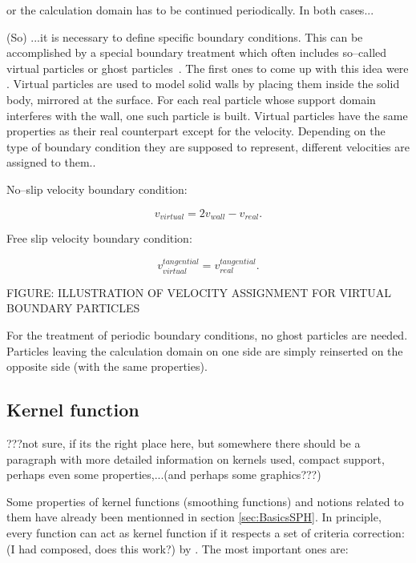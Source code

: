\documentclass{report}
\begin{document}
 or the calculation domain has to be continued periodically. In both cases...

(So) ...it is necessary to define specific boundary
conditions. This can be accomplished by a special boundary treatment which
often includes so--called virtual particles or ghost
particles~\cite{Liu2003}. The first ones to come up with this idea were
\cite{LIBERSKY1993}. Virtual particles are used to model solid walls by
placing them inside the solid body, mirrored at the surface. For each real
particle whose support domain interferes with the wall, one such particle is
built. Virtual particles have the same properties as their real counterpart
except for the velocity. Depending on the type of boundary condition they are
supposed to represent, different velocities are assigned to them.\cite{Hu2006}.

No--slip velocity boundary condition:

\begin{equation}
v_{virtual}=2v_{wall}-v_{real}.
\end{equation}

Free slip velocity boundary condition:

\begin{equation}
v_{virtual}^{tangential}=v_{real}^{tangential}.
\end{equation}

FIGURE: ILLUSTRATION OF VELOCITY ASSIGNMENT FOR VIRTUAL BOUNDARY PARTICLES

For the treatment of periodic boundary conditions, no ghost particles are
needed. Particles leaving the calculation domain on one side are simply
reinserted on the opposite side (with the same properties).


\subsection{Kernel function}
\label{sec:KernelFunction}
???not sure, if its the right place here, but somewhere there should be a
paragraph with more detailed information on kernels used, compact support,
perhaps even some properties,...(and perhaps some graphics???)


Some properties of kernel functions (smoothing functions) and notions related
to them have already been mentionned in section
\ref{sec:BasicsSPH}. In principle, every function can act as kernel function
if it respects a set of criteria 
correction: (I had composed, does this work?)
by \cite{Liu2003}.
The most important ones are:
\end{document}
